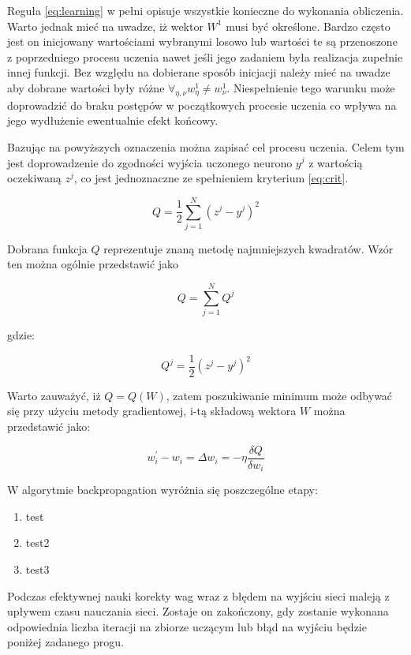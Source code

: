 Reguła \ref{eq:learning} w pełni opisuje wszystkie konieczne do wykonania obliczenia. Warto jednak mieć na uwadze, iż wektor $W^{1}$ musi być określone. Bardzo często jest on inicjowany wartościami wybranymi losowo lub wartości te są przenoszone z poprzedniego procesu uczenia nawet jeśli jego zadaniem była realizacja zupełnie innej funkcji.
Bez względu na dobierane sposób inicjacji należy mieć na uwadze aby dobrane wartości były różne $\forall_{\eta, \nu} w^{1}_{\eta} \neq w^{1}_{\nu} $. Niespełnienie tego warunku może doprowadzić do braku postępów w początkowych procesie uczenia co wpływa na jego wydłużenie ewentualnie efekt końcowy. 

Bazując na powyższych oznaczenia można zapisać cel procesu uczenia. Celem tym jest doprowadzenie do zgodności wyjścia uczonego neurono $y^{j}$ z wartością oczekiwaną $z^{j}$, co jest jednoznaczne ze spełnieniem kryterium \ref{eq:crit}.

\begin{equation}
Q = \frac{1}{2} \sum_{j = 1}^{N} (z^{j} - y^{j})^{2}
\label{eq:crit}
\end{equation}

Dobrana funkcja $Q$ reprezentuje znaną metodę najmniejszych kwadratów.
Wzór ten można ogólnie przedstawić jako

\begin{equation}
Q = \sum_{j = 1}^{N} Q^{j}
\label{eq:common_crit}
\end{equation}

gdzie:

\begin{equation}
Q^{j} = \frac{1}{2}(z^{j} - y^{j})^{2}
\label{eq:condition_crit}
\end{equation}

Warto zauważyć, iż $Q = Q(W)$, zatem poszukiwanie minimum może odbywać się przy użyciu metody gradientowej, i-tą składową wektora $W$ można przedstawić jako:

\begin{equation}
w^{'}_i - w_{i} = \Delta w_{i} = - \eta \frac{\delta Q}{\delta w_{i}}
\label{eq:delta_member}
\end{equation}

W algorytmie backpropagation wyróżnia się poszczególne etapy:
\begin{enumerate}
	\item test
	\item test2
	\item test3
\end{enumerate}


Podczas efektywnej nauki korekty wag wraz z błędem na wyjściu sieci maleją z upływem czasu nauczania sieci. Zostaje on zakończony, gdy zostanie wykonana odpowiednia liczba iteracji na zbiorze uczącym lub błąd na wyjściu będzie poniżej zadanego progu. 






